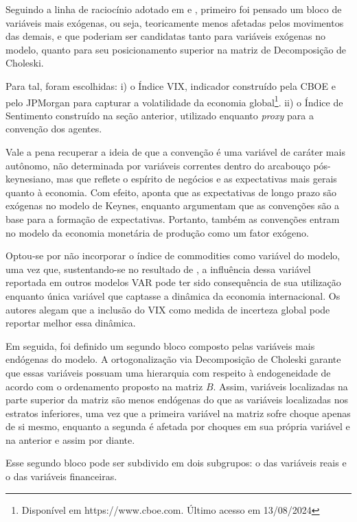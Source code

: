 Seguindo a linha de raciocínio adotado em \textcite{passos_mecanismo_2022} e \textcite{ferreira_global_2022}, primeiro foi pensado um bloco de variáveis mais exógenas, ou seja, teoricamente menos afetadas pelos movimentos das demais, e que poderiam ser candidatas tanto para variáveis exógenas no modelo, quanto para seu posicionamento superior na matriz de Decomposição de Choleski. 

Para tal, foram escolhidas:
i) o Índice VIX, indicador construído pela CBOE e pelo JPMorgan para capturar a volatilidade da economia global\footnote{Disponível em https://www.cboe.com. Último acesso em 13/08/2024}. 
ii) o Índice de Sentimento construído na seção anterior, utilizado enquanto \textit{proxy} para a convenção dos agentes. 

Vale a pena recuperar a ideia de que a convenção é uma variável de caráter mais autônomo, não determinada por variáveis correntes dentro do arcabouço pós-keynesiano, mas que reflete o espírito de negócios e as expectativas mais gerais quanto à economia. Com efeito, \textcite{carvalho_keynes_2020} aponta que as expectativas de longo prazo são exógenas no modelo de Keynes, enquanto \textcite{arestis_brazilian_2019} argumentam que as convenções são a base para a formação de expectativas. Portanto, também as convenções entram no modelo da economia monetária de produção como um fator exógeno. 

Optou-se por não incorporar o índice de commodities como variável do modelo, uma vez que, sustentando-se no resultado de \textcite{ferreira_global_2022}, a influência dessa variável reportada em outros modelos VAR pode ter sido consequência de sua utilização enquanto única variável que captasse a dinâmica da economia internacional. Os autores alegam que a inclusão do VIX como medida de incerteza global pode reportar melhor essa dinâmica.

Em seguida, foi definido um segundo bloco composto pelas variáveis mais endógenas do modelo. A ortogonalização via Decomposição de Choleski garante que essas variáveis possuam uma hierarquia com respeito à endogeneidade de acordo com o ordenamento proposto na matriz \(B\). Assim, variáveis localizadas na parte superior da matriz são menos endógenas do que as variáveis localizadas nos estratos inferiores, uma vez que a primeira variável na matriz sofre choque apenas de si mesmo, enquanto a segunda é afetada por choques em sua própria variável e na anterior e assim por diante.

Esse segundo bloco pode ser subdivido em dois subgrupos: o das variáveis reais e o das variáveis financeiras.

